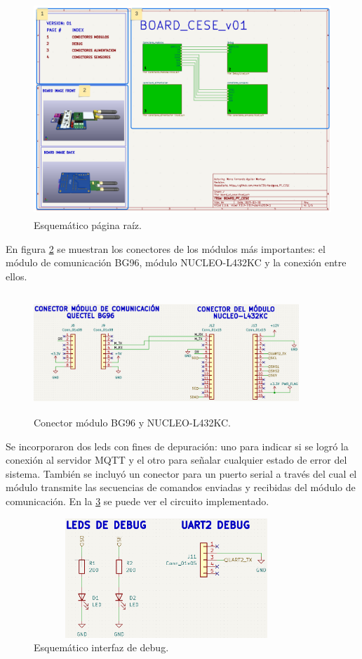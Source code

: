 \begin{figure}[h]
  \centering
	\includegraphics[width=\textwidth, height=8cm]{./Figures/esquematico_raiz.png}
	\caption{Esquemático página raíz.}
	\label{fig:esquematico root}
\end{figure}

En figura \ref{fig:esquematico modulos} se muestran los conectores de los módulos más importantes: el módulo de comunicación BG96, módulo NUCLEO-L432KC y la conexión entre ellos.

\begin{figure}[h]
  \centering
	\includegraphics[width=10cm, height=4.5cm]{./Figures/esquematico_modulos.png}
	\caption{Conector módulo BG96 y NUCLEO-L432KC.}
	\label{fig:esquematico modulos}
\end{figure}

Se incorporaron dos leds con fines de depuración: uno para indicar si se logró la  conexión al servidor MQTT y el otro para señalar cualquier estado de error del sistema. También se incluyó un conector para un puerto serial a través del cual el módulo transmite las secuencias de comandos enviadas y recibidas del módulo de comunicación. En la \ref{fig:esquematico conectores de debug} se puede ver el circuito implementado.
\begin{figure}[h!]
  \centering
	\includegraphics[width=10cm, height=4.5cm]{./Figures/esquematico_debug.png}
	\caption{Esquemático interfaz de debug.}
	\label{fig:esquematico conectores de debug}
\end{figure}

